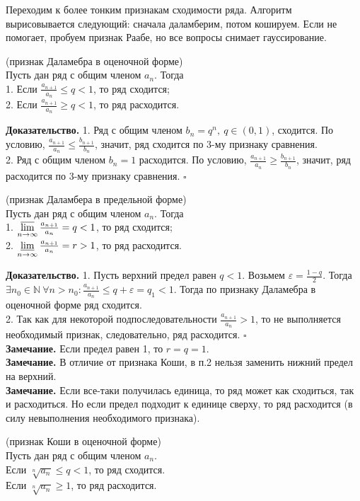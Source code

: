 Переходим к более тонким признакам сходимости ряда. Алгоритм вырисовывается 
следующий: сначала даламберим, потом кошируем. Если не помогает, пробуем 
признак Раабе, но все вопросы снимает гауссирование. 
\begin{theor} (признак Даламебра в оценочной форме)\\
Пусть дан ряд с общим членом $a_n$. Тогда\\
1. Если $\frac{a_{n+1}}{a_n}\leqslant q<1$, то ряд сходится;\\
2. Если $\frac{a_{n+1}}{a_n}\geqslant q<1$, то ряд расходится.
\end{theor}
\textbf{Доказательство.} 
1. Ряд с общим членом $b_n=q^n,~q\in(0,1)$, сходится. По условию, 
$\frac{a_{n+1}}{a_n}\leqslant \frac{b_{n+1}}{b_n}$, значит, ряд
сходится по 3-му признаку сравнения.\\
2. Ряд с общим членом $b_n=1$ расходится. По условию, 
$\frac{a_{n+1}}{a_n}\geqslant\frac{b_{n+1}}{b_n}$, значит, ряд
расходится по 3-му признаку сравнения. $\square$
\begin{theor}
    (признак Даламбера в предельной форме)\\
    Пусть дан ряд с общим членом $a_n$. Тогда\\
    1. $\varlimsup\limits_{n \to \infty}\frac{a_{n+1}}{a_n}=q<1$, 
    то ряд сходится;\\
    2. $\varliminf\limits_{n \to \infty}\frac{a_{n+1}}{a_n}=r>1$,
    то ряд расходится.
\end{theor}
\textbf{Доказательство.}  
1. Пусть верхний предел равен $q<1$. Возьмем  $\varepsilon=\frac{1-q}{2}$.
Тогда $\exists n_0\in \mathbb{N}~\forall n>n_0: \frac{a_{n+1}}{a_n}\leqslant 
q+\varepsilon=q_1<1$. Тогда по признаку Даламебра в оценочной форме ряд 
сходится.\\
2. Так как для некоторой подпоследовательности $\frac{a_{n+1}}{a_n}>1$, то
не выполняется необходимый признак, следовательно, ряд расходится. 
$\square$\\ 
\textbf{Замечание.} Если предел равен 1, то $r=q=1$.\\
\textbf{Замечание.} В отличие от признака Коши, в п.2 нельзя заменить
нижний предел на верхний.\\
\textbf{Замечание.} Если все-таки получилась единица, то ряд может как 
сходиться, так и расходиться. Но если предел подходит к единице сверху, то
ряд расходится (в силу невыполнения необходимого признака). 
\begin{theor}
    (признак Коши в оценочной форме)\\
    Пусть дан ряд с общим членом $a_n$.\\
    Если $\sqrt[n]{a_n}\leqslant q<1$, то ряд сходится.\\
    Если $\sqrt[n]{a_n}\geqslant1$, то ряд расходится.
\end{theor}
